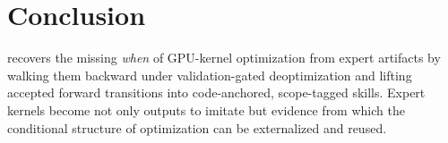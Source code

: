 \section{Conclusion}
\sys recovers the missing \emph{when} of GPU-kernel optimization from expert artifacts by walking them backward under validation-gated deoptimization and lifting accepted forward transitions into code-anchored, scope-tagged skills. Expert kernels become not only outputs to imitate but evidence from which the conditional structure of optimization can be externalized and reused.

